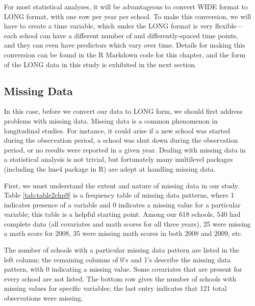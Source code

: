 \documentclass[
]{krantz}
\begin{document}
For most statistical analyses, it will be advantageous to convert WIDE format to LONG format, with one row per year per school. To make this conversion, we will have to create a time variable, which under the LONG format is very flexible---each school can have a different number of and differently-spaced time points, and they can even have predictors which vary over time. Details for making this conversion can be found in the R Markdown code for this chapter, and the form of the LONG data in this study is exhibited in the next section.

\subsection{Missing Data}\label{missing}

In this case, before we convert our data to LONG form, we should first address problems with missing data.  Missing data is a common phenomenon in longitudinal studies. For instance, it could arise if a new school was started during the observation period, a school was shut down during the observation period, or no results were reported in a given year. Dealing with missing data in a statistical analysis is not trivial, but fortunately many multilevel packages (including the lme4 package in R) are adept at handling missing data.

First, we must understand the extent and nature of missing data in our study. Table \ref{tab:table2chp9} is a frequency table of missing data patterns, where 1 indicates presence of a variable and 0 indicates a missing value for a particular variable; this table is a helpful starting point. Among our 618 schools, 540 had complete data (all covariates and math scores for all three years), 25 were missing a math score for 2008, 35 were missing math scores in both 2008 and 2009, etc.

The number of schools with a particular missing data pattern are listed in the left column; the remaining columns of 0's and 1's describe the missing data pattern, with 0 indicating a missing value. Some covariates that are present for every school are not listed. The bottom row gives the number of schools with missing values for specific variables; the last entry indicates that 121 total observations were missing.
\end{document}
